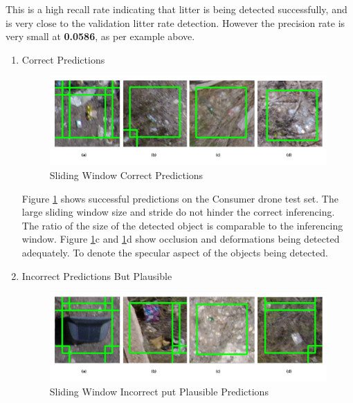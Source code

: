 \documentclass{IEEEtran}
\begin{document}
This is a high recall rate indicating that litter is being detected successfully, and is very close to the validation litter rate detection.  However the precision rate is very small at \textbf{0.0586}, as per example above. 

\begin{enumerate}
\item Correct Predictions
\begin{figure}[H]
\centering
\includegraphics[scale=0.4]{images/test1-correct.png}
\caption{Sliding Window Correct Predictions}
\label{fig:test1correct}
\end{figure}

Figure \ref{fig:test1correct} shows successful predictions on the Consumer drone test set. The large sliding window size and stride do not hinder the correct inferencing. The ratio of the size of the detected object is comparable to the inferencing window. Figure \ref{fig:test1correct}c and \ref{fig:test1correct}d show occlusion and deformations being detected adequately. To denote the specular aspect of the objects being detected.

\item Incorrect Predictions But Plausible
\begin{figure}[H]
\centering
\includegraphics[scale=0.4]{images/test1-plausible.png}
\caption{Sliding Window Incorrect put Plausible Predictions}
\label{fig:test1plausible}
\end{figure}


\end{enumerate}
\end{document}
